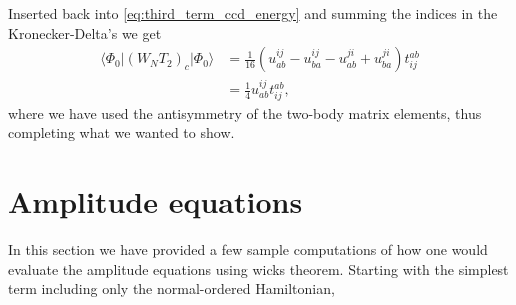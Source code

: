 \documentclass[
    a4paper, aps, twocolumn, floatfix, superscriptaddress,
    nofootinbib]{revtex4-1}
\newcommand{\1}{\mathds{1}}
\newcommand{\para}[1]{\left(#1\right)}
\newcommand{\bra}[1]{\langle #1\lvert}
\newcommand{\ket}[1]{\rvert #1\rangle}
\newcommand{\kslat}{\ket{\Phi_0}}
\newcommand{\bslat}{\bra{\Phi_0}}
\begin{document}
    Inserted back into \autoref{eq:third_term_ccd_energy} and summing the
    indices in the Kronecker-Delta's we get
    \begin{align}
        \bslat (W_N T_2)_c\kslat
        &=
        \frac{1}{16}\para{
            u^{ij}_{ab} - u^{ij}_{ba} - u^{ji}_{ab} + u^{ji}_{ba}
        }
        t^{ab}_{ij}
        \nonumber \\
        &=
        \frac{1}{4}u^{ij}_{ab}t^{ab}_{ij},
    \end{align}
    where we have used the antisymmetry of the two-body matrix elements, thus
    completing what we wanted to show.

\section{Amplitude equations}

    \label{app:wick_on_amplitude}

    In this section we have provided a few sample computations of how one would
    evaluate the amplitude equations using wicks theorem. Starting with the simplest
    term including only the normal-ordered Hamiltonian,
\end{document}
